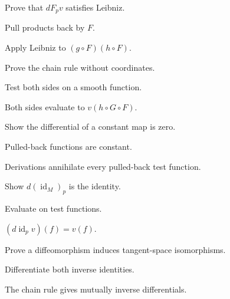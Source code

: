 \begin{exercise}\label{exr:vii04-13}
Prove that \(dF_pv\) satisfies Leibniz.
\end{exercise}
\begin{hint}
Pull products back by \(F\).
\end{hint}
\begin{solution}
Apply Leibniz to \((g\circ F)(h\circ F)\).
\end{solution}

\begin{exercise}\label{exr:vii04-14}
Prove the chain rule without coordinates.
\end{exercise}
\begin{hint}
Test both sides on a smooth function.
\end{hint}
\begin{solution}
Both sides evaluate to \(v(h\circ G\circ F)\).
\end{solution}

\begin{exercise}\label{exr:vii04-15}
Show the differential of a constant map is zero.
\end{exercise}
\begin{hint}
Pulled-back functions are constant.
\end{hint}
\begin{solution}
Derivations annihilate every pulled-back test function.
\end{solution}

\begin{exercise}\label{exr:vii04-16}
Show \(d(\operatorname{id}_M)_p\) is the identity.
\end{exercise}
\begin{hint}
Evaluate on test functions.
\end{hint}
\begin{solution}
\((d\operatorname{id}_p v)(f)=v(f)\).
\end{solution}

\begin{exercise}\label{exr:vii04-17}
Prove a diffeomorphism induces tangent-space isomorphisms.
\end{exercise}
\begin{hint}
Differentiate both inverse identities.
\end{hint}
\begin{solution}
The chain rule gives mutually inverse differentials.
\end{solution}

